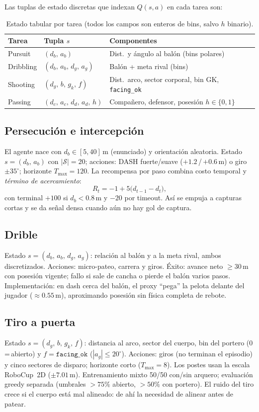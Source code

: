 \documentclass[11pt,a4paper]{article}
\begin{document}
Las tuplas de estado discretas que indexan $Q(s,a)$ en cada tarea son:

\begin{table}[htbp]
\centering
\small
\begin{tabular}{@{}llp{6.4cm}@{}}
\toprule
Tarea & Tupla $s$ & Componentes \\
\midrule
Pursuit & $(d_b,\,a_b)$ & Dist.\ y ángulo al balón (bins polares) \\
Dribbling & $(d_b,\,a_b,\,d_g,\,a_g)$ & Balón + meta rival (bins) \\
Shooting & $(d_g,\,b,\,g_k,\,f)$ & Dist.\ arco, sector corporal, bin GK, \texttt{facing\_ok} \\
Passing & $(d_c,\,a_c,\,d_d,\,a_d,\,h)$ & Compañero, defensor, posesión $h\in\{0,1\}$ \\
\bottomrule
\end{tabular}
\caption{Estado tabular por tarea (todos los campos son enteros de bins, salvo $h$ binario).}
\end{table}

\subsection{Persecución e intercepción}
El agente nace con $d_b\in[5,40]$\,m (enunciado) y orientación aleatoria.
Estado $s=(d_b,\,a_b)$ con $|\mathcal{S}|=20$; acciones: DASH fuerte/suave ($+1.2$\,/\,$+0.6$\,m) o giro $\pm 35^\circ$; horizonte $T_{\max}=120$.
La recompensa por paso combina costo temporal y \emph{término de acercamiento}:
\[
R_t = -1 + 5\bigl(d_{t-1}-d_t\bigr),
\]
con terminal $+100$ si $d_b<0.8$\,m y $-20$ por timeout.
Así se empuja a capturas cortas y se da señal densa cuando aún no hay gol de captura.

\subsection{Drible}
Estado $s=(d_b,\,a_b,\,d_g,\,a_g)$: relación al balón y a la meta rival, ambos discretizados.
Acciones: micro-pateo, carrera y giros.
Éxito: avance neto $\ge 30$\,m con posesión vigente; fallo si sale de cancha o pierde el balón varios pasos.
Implementación: en dash cerca del balón, el proxy ``pega'' la pelota delante del jugador ($\approx 0.55$\,m), aproximando posesión sin física completa de rebote.

\subsection{Tiro a puerta}
Estado $s=(d_g,\,b,\,g_k,\,f)$: distancia al arco, sector del cuerpo, bin del portero (0\,=\,abierto) y $f=\texttt{facing\_ok}$ ($|a_g|\le 20^\circ$).
Acciones: giros (no terminan el episodio) y cinco sectores de disparo; horizonte corto ($T_{\max}=8$).
Los postes usan la escala RoboCup~2D ($\pm 7.01$\,m).
Entrenamiento mixto 50/50 con/sin arquero; evaluación greedy separada (umbrales $>75\%$ abierto, $>50\%$ con portero).
El ruido del tiro crece si el cuerpo está mal alineado: de ahí la necesidad de alinear antes de patear.
\end{document}
